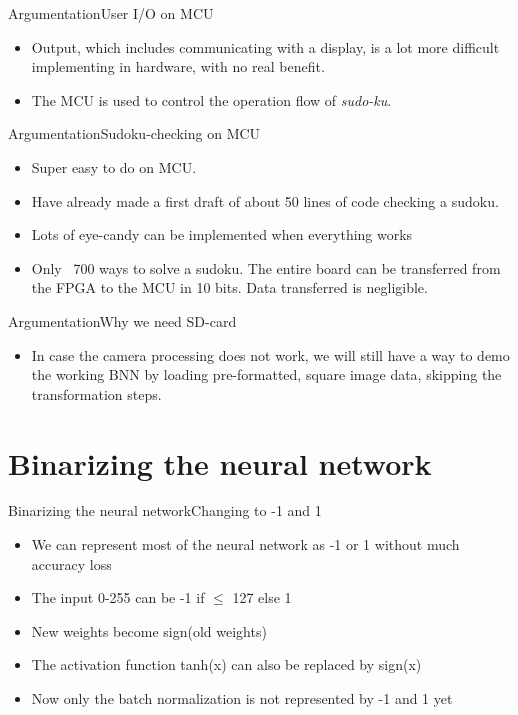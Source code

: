\documentclass[10pt]{beamer}
\begin{document}
\begin{frame}{Argumentation}{User I/O on MCU}
\begin{itemize}
\item Output, which includes communicating with a display, is a lot more difficult implementing in hardware, with no real benefit.
\item The MCU is used to control the operation flow of \textit{sudo-ku}.
\end{itemize}
\end{frame}

\begin{frame}{Argumentation}{Sudoku-checking on MCU}
\begin{itemize}
\item Super easy to do on MCU.
\item Have already made a first draft of about 50 lines of code checking a sudoku.
\item Lots of eye-candy can be implemented when everything works
\item Only ~700 ways to solve a sudoku. The entire board can be transferred from the FPGA to the MCU in 10 bits. Data transferred is negligible.
\end{itemize}
\end{frame}

\begin{frame}{Argumentation}{Why we need SD-card}
\begin{itemize}
\item In case the camera processing does not work, we will still have a way to demo the working BNN by loading pre-formatted, square image data, skipping the transformation steps.
\end{itemize}
\end{frame}


\section{Binarizing the neural network}
\begin{frame}{Binarizing the neural network}{Changing to -1 and 1}
\begin{itemize}
	\item We can represent most of the neural network as -1 or 1 without much accuracy loss
	\item The input 0-255 can be -1 if $\leq$ 127 else 1
	\item New weights become sign(old weights)
	\item The activation function tanh(x) can also be replaced by sign(x)
	\item Now only the batch normalization is not represented by -1 and 1 yet
\end{itemize}
\end{frame}
\end{document}
